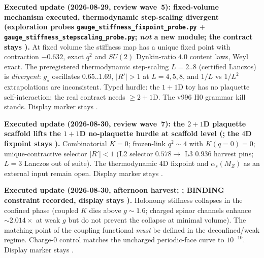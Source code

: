 \par\smallskip\noindent\textbf{Executed update (2026-08-29, review wave~5): fixed-volume
mechanism executed, thermodynamic step-scaling divergent
(exploration probes \texttt{gauge\_stiffness\_\allowbreak fixpoint\_\allowbreak probe.py} $+$
\texttt{gauge\_stiffness\_\allowbreak stepscaling\_\allowbreak probe.py}; \emph{not} a new module; the contract stays \mO).}
At fixed volume the stiffness map has a unique fixed point with contraction $-0.632$, exact
$q^2$ and $SU(2)$ Dynkin-ratio $4.0$ content laws, Weyl exact.  The preregistered thermodynamic
step-scaling $L=2{..}8$ (certified Lanczos) is \emph{divergent}: $g_\star$ oscillates
$0.65{..}1.69$, $\lvert R'\rvert>1$ at $L=4,5,8$, and $1/L$ vs $1/L^2$ extrapolations are
inconsistent.  Typed hurdle: the $1{+}1$D toy has no plaquette self-interaction; the real
contract needs $\ge 2{+}1$D.  The v996 H0 grammar kill stands.  Display marker stays \mO.

\par\smallskip\noindent\textbf{Executed update (2026-08-30, review wave~7): the $2{+}1$D
plaquette scaffold lifts the $1{+}1$D no-plaquette hurdle at scaffold level
(; the $4$D
fixpoint stays \mO).}
Combinatorial $K=0$; frozen-link $q^2\sim4$ with $K(q=0)=0$; unique-contractive selector
$\lvert R'\rvert<1$ (L2 selector $0.578\to$ L3 $0.936$ harvest pins; $L=3$ Lanczos out of
suite).  The thermodynamic $4$D fixpoint and $\alpha_s(M_Z)$ as an external input remain open.
Display marker stays \mO.

\par\smallskip\noindent\textbf{Executed update (2026-08-30, afternoon harvest;
;
BINDING constraint recorded, display stays \mO).}
Holonomy stiffness collapses in the confined phase (coupled $K$ dies above $g\sim1.6$;
charged spinor channels enhance $\sim2.014{\times}$ at weak $g$ but do not prevent the
collapse at minimal volume).  The matching point of the coupling functional
\emph{must} be defined in the deconfined/weak regime.  Charge-$0$ control matches the
uncharged periodic-face curve to $10^{-10}$.  Display marker stays \mO.

